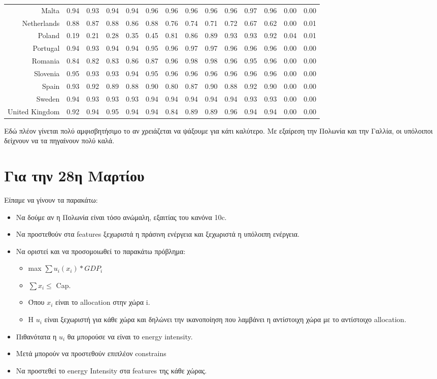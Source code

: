 \documentclass[a4paper,twoside,10pt]{article}
\begin{document}
\begin{table}[ht]
\begin{tabular}{|r|rrrrr|rrrrrr|rr|}
		Malta & 0.94 & 0.93 & 0.94 & 0.94 & 0.96 & 0.96 & 0.96 & 0.96 & 0.96 & 0.97 & 0.96 & 0.00 & 0.00 \\ 
		Netherlands & 0.88 & 0.87 & 0.88 & 0.86 & 0.88 & 0.76 & 0.74 & 0.71 & 0.72 & 0.67 & 0.62 & 0.00 & 0.01 \\
		Poland & 0.19 & 0.21 & 0.28 & 0.35 & 0.45 & 0.81 & 0.86 & 0.89 & 0.93 & 0.93 & 0.92 & 0.04 & 0.01 \\
		Portugal & 0.94 & 0.93 & 0.94 & 0.94 & 0.95 & 0.96 & 0.97 & 0.97 & 0.96 & 0.96 & 0.96 & 0.00 & 0.00 \\
		Romania & 0.84 & 0.82 & 0.83 & 0.86 & 0.87 & 0.96 & 0.98 & 0.98 & 0.96 & 0.95 & 0.96 & 0.00 & 0.00 \\ 
		Slovenia & 0.95 & 0.93 & 0.93 & 0.94 & 0.95 & 0.96 & 0.96 & 0.96 & 0.96 & 0.96 & 0.96 & 0.00 & 0.00 \\		\hline
		Spain & 0.93 & 0.92 & 0.89 & 0.88 & 0.90 & 0.80 & 0.87 & 0.90 & 0.88 & 0.92 & 0.90 & 0.00 & 0.00 \\
		Sweden & 0.94 & 0.93 & 0.93 & 0.93 & 0.94 & 0.94 & 0.94 & 0.94 & 0.94 & 0.93 & 0.93 & 0.00 & 0.00 \\
		United Kingdom & 0.92 & 0.94 & 0.95 & 0.94 & 0.94 & 0.84 & 0.89 & 0.89 & 0.96 & 0.94 & 0.94 & 0.00 & 0.00 \\ 
		\hline
	\end{tabular}
\end{table}
Εδώ πλέον γίνεται πολύ αμφισβητήσιμο το αν χρειάζεται να ψάξουμε για κάτι καλύτερο. Με εξαίρεση την Πολωνία και την Γαλλία, οι υπόλοιποι δείχνουν να τα πηγαίνουν πολύ καλά. 

\section{Για την 28η Μαρτίου}
Είπαμε να γίνουν τα παρακάτω:
\begin{itemize}
	\item Να δούμε αν η Πολωνία είναι τόσο ανώμαλη, εξαιτίας του κανόνα 10c.
	\item Να προστεθούν στα features ξεχωριστά η πράσινη ενέργεια και ξεχωριστά η υπόλοιπη ενέργεια. 
	\item Να οριστεί και να προσομοιωθεί το παρακάτω πρόβλημα:
	\begin{itemize}
		\item max $\sum{u_i(x_i)*GDP_i}$
		\item $\sum {x_i} \leq$ Cap.
		\item Όπου $x_i$ είναι το allocation στην χώρα i.
		\item Η $u_i$ είναι ξεχωριστή για κάθε χώρα και δηλώνει την ικανοποίηση που λαμβάνει η αντίστοιχη χώρα με το αντίστοιχο allocation.
	\end{itemize}
	\item Πιθανότατα η  $u_i$ θα μπορούσε να είναι το energy intensity.
	\item Μετά μπορούν να προστεθούν επιπλέον constrains 
	\item Να προστεθεί το energy Intensity στα features της κάθε χώρας.
\end{itemize}
\end{document}
